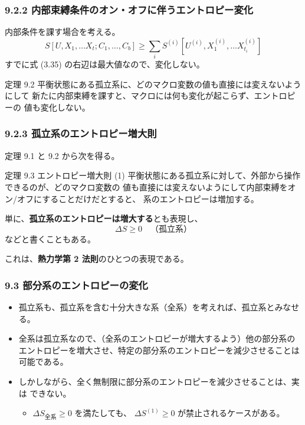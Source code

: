 \documentclass[aspectratio=149]{beamer}
\newcommand{\hmemph}[1]{\textbf{#1}}
\begin{document}
\begin{frame}
	\frametitle{9.2.2 内部束縛条件のオン・オフに伴うエントロピー変化}
	内部条件を課す場合を考える。
	\[
		S[U,X_1,\dots X_t;C_1,\dots,C_b]
		\geq \sum_i S^{(i)}[U^{(i)},X^{(i)}_1,\dots X^{(i)}_{t_i}]\tag{3.35}
	\]
	すでに式 (3.35) の右辺は最大値なので、変化しない。
	
	\begin{block}{定理 9.2}
		平衡状態にある孤立系に、どのマクロ変数の値も直接には変えないようにして
		新たに内部束縛を課すと、マクロには何も変化が起こらず、エントロピーの
		値も変化しない。
	\end{block}
\end{frame}

\begin{frame}
	\frametitle{9.2.3 孤立系のエントロピー増大則}
	定理 9.1 と 9.2 から次を得る。
	\begin{block}{定理 9.3 エントロピー増大則 (1)}
		平衡状態にある孤立系に対して、外部から操作できるのが、どのマクロ変数の
		値も直接には変えないようにして内部束縛をオン/オフにすることだけだとすると、
		系のエントロピーは増加する。
	\end{block}
	
	単に、\hmemph{孤立系のエントロピーは増大する}とも表現し、
	\[\Delta S\geq0\quad\text{（孤立系）}\tag{9.3}\]
	などと書くこともある。
	
	これは、\hmemph{熱力学第 2 法則}のひとつの表現である。
\end{frame}

\begin{frame}
	\frametitle{9.3 部分系のエントロピーの変化}
	\begin{itemize}
		\item 孤立系も、孤立系を含む十分大きな系（全系）を考えれば、孤立系とみなせる。
		\item 全系は孤立系なので、（全系のエントロピーが増大するよう）他の部分系の
			エントロピーを増大させ、特定の部分系のエントロピーを減少させることは
			可能である。
		\item しかしながら、全く無制限に部分系のエントロピーを減少させることは、実は
			できない。
			\begin{itemize}
				\item \(\Delta S_\text{全系}\geq0\) を満たしても、
					\(\Delta S^{(1)}\geq0\) が禁止されるケースがある。
			\end{itemize}
	\end{itemize}
\end{frame}
\end{document}
